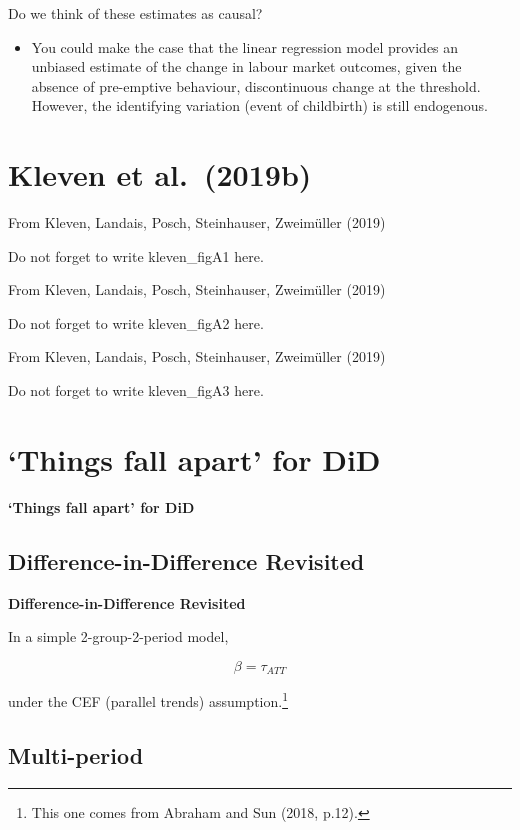 \documentclass[
  letterpaper,
  DIV=11,
  numbers=noendperiod]{scrreprt}
\providecommand{\tightlist}{%
  \setlength{\itemsep}{0pt}\setlength{\parskip}{0pt}}\usepackage{longtable,booktabs,array}
\theoremstyle{definition}
\theoremstyle{remark}
\begin{document}
Do we think of these estimates as causal?

\begin{itemize}
\tightlist
\item
  You could make the case that the linear regression model provides an
  unbiased estimate of the change in labour market outcomes, given the
  absence of pre-emptive behaviour, discontinuous change at the
  threshold. However, the identifying variation (event of childbirth) is
  still endogenous.
\end{itemize}

\chapter{Kleven et al.~(2019b)}\label{kleven-et-al.-2019b}

From Kleven, Landais, Posch, Steinhauser, Zweimüller (2019)

Do not forget to write kleven\_figA1 here.

From Kleven, Landais, Posch, Steinhauser, Zweimüller (2019)

Do not forget to write kleven\_figA2 here.

From Kleven, Landais, Posch, Steinhauser, Zweimüller (2019)

Do not forget to write kleven\_figA3 here.

\chapter{`Things fall apart' for DiD}\label{things-fall-apart-for-did}

\textbf{`Things fall apart' for DiD}

\section{Difference-in-Difference
Revisited}\label{difference-in-difference-revisited}

\textbf{Difference-in-Difference Revisited}

In a simple 2-group-2-period model,

\[
\beta = \tau_{ATT}
\]

under the CEF (parallel trends) assumption.\footnote{This one comes from
  Abraham and Sun (2018, p.12).}

\section{Multi-period}\label{multi-period}
\end{document}
